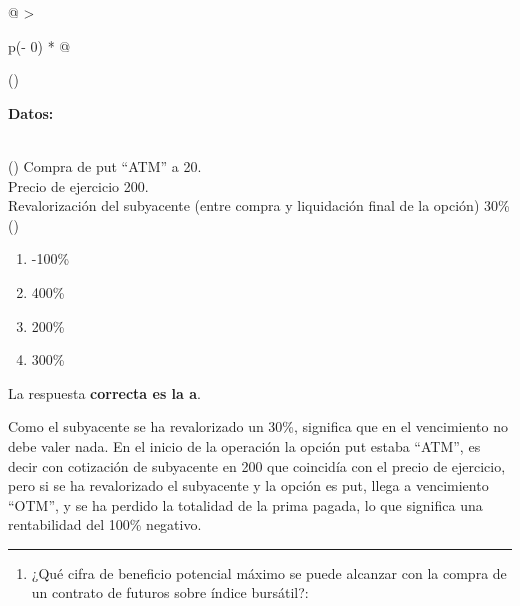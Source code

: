 \documentclass[
  letterpaper,
  DIV=11,
  numbers=noendperiod]{scrreprt}
\providecommand{\tightlist}{%
  \setlength{\itemsep}{0pt}\setlength{\parskip}{0pt}}\usepackage{longtable,booktabs,array}
\begin{document}
\begin{longtable}[]{@{}
  >{\raggedright\arraybackslash}p{(\columnwidth - 0\tabcolsep) * }@{}}
\toprule()
\begin{minipage}[b]{\linewidth}\raggedright
\textbf{Datos:}
\end{minipage} \\
\midrule()
\endhead
Compra de put ``ATM'' a 20. \\
Precio de ejercicio 200. \\
Revalorización del subyacente (entre compra y liquidación final de la
opción) 30\% \\
\bottomrule()
\end{longtable}

\begin{enumerate}
\def\labelenumi{\alph{enumi})}
\item
  -100\%
\item
  400\%
\item
  200\%
\item
  300\%
\end{enumerate}

\begin{tcolorbox}[enhanced jigsaw, left=2mm, opacityback=0, colback=white, breakable, arc=.35mm, bottomrule=.15mm, rightrule=.15mm, toprule=.15mm, leftrule=.75mm, colframe=quarto-callout-tip-color-frame]
\begin{minipage}[t]{5.5mm}
\textcolor{quarto-callout-tip-color}{\faLightbulb}
\end{minipage}%
\begin{minipage}[t]{\textwidth - 5.5mm}

La respuesta \textbf{correcta es la a}.

Como el subyacente se ha revalorizado un 30\%, significa que en el
vencimiento no debe valer nada. En el inicio de la operación la opción
put estaba ``ATM'', es decir con cotización de subyacente en 200 que
coincidía con el precio de ejercicio, pero si se ha revalorizado el
subyacente y la opción es put, llega a vencimiento ``OTM'', y se ha
perdido la totalidad de la prima pagada, lo que significa una
rentabilidad del 100\% negativo.

\end{minipage}%
\end{tcolorbox}

\begin{center}\rule{0.5\linewidth}{0.5pt}\end{center}

\begin{enumerate}
\def\labelenumi{\arabic{enumi}.}
\setcounter{enumi}{48}
\tightlist
\item
  ¿Qué cifra de beneficio potencial máximo se puede alcanzar con la
  compra de un contrato de futuros sobre índice bursátil?:
\end{enumerate}
\end{document}

